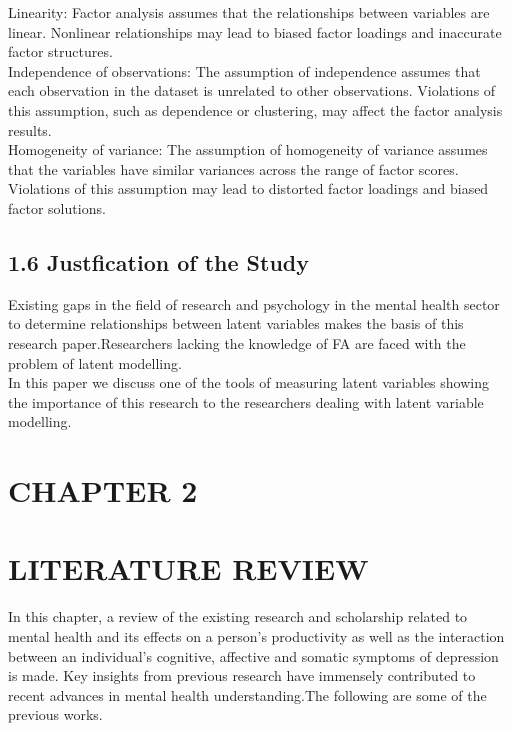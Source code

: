 \documentclass[12pt]{article}
\numberwithin{equation}{section}
\begin{document}
\noindent Linearity: Factor analysis assumes that the relationships between variables are linear. Nonlinear relationships may lead to biased factor loadings and inaccurate factor structures.\\

\noindent Independence of observations: The assumption of independence assumes that each observation in the dataset is unrelated to other observations. Violations of this assumption, such as dependence or clustering, may affect the factor analysis results.\\

\noindent Homogeneity of variance: The assumption of homogeneity of variance assumes that the variables have similar variances across the range of factor scores. Violations of this assumption may lead to distorted factor loadings and biased factor solutions.\\


\subsection*{1.6 Justfication of the Study}
Existing gaps in the field of research and psychology in the mental health sector to determine relationships between latent variables makes the basis of this research paper.Researchers lacking the knowledge of FA are faced with the problem of latent modelling.\\
In this paper we discuss one of the tools of measuring latent variables showing the importance of this research to the researchers dealing with latent variable modelling.
\newpage
\section*{CHAPTER 2}
\section*{LITERATURE REVIEW}
In this chapter, a review of the existing research and scholarship related to mental health and its effects on a person’s productivity as well as the interaction between an individual’s cognitive, affective and somatic symptoms of depression is made. Key insights from previous research have immensely contributed to recent advances in mental health understanding.The following are some of the previous works.\\
\end{document}
